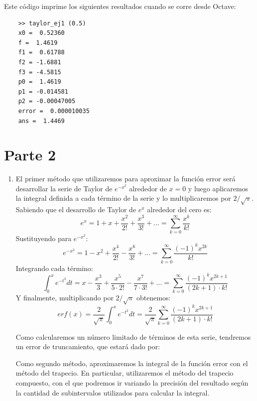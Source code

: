 \documentclass[titlepage,a4paper]{article}
\begin{document}
Este código imprime los siguientes resultados cuando se corre desde Octave:

\begin{lstlisting}
	>> taylor_ej1 (0.5)
	x0 =  0.52360
	f =  1.4619
	f1 =  0.61788
	f2 = -1.6881
	f3 = -4.5815
	p0 =  1.4619
	p1 = -0.014581
	p2 = -0.00047005
	error =  0.000010035
	ans =  1.4469
\end{lstlisting}

\section{Parte 2}\label{sec:parte2}
	\begin{enumerate}[label=(\alph*)]
		\item 
			El primer método que utilizaremos para aproximar la función error\cite{error_function} será desarrollar la serie de Taylor 
			de $e^{-x^2}$ alrededor de $x=0$ y luego aplicaremos la integral definida a cada término de la serie y 
			lo multiplicaremos por $2/\sqrt{\pi}$.\\
			Sabiendo que el desarrollo de Taylor de $e^x$ alrededor del cero es:
				\begin{equation}
					e^x = 1 + x + \frac{x^2}{2!} + \frac{x^3}{3!} + ... = \sum_{k=0}^{\infty}\frac{x^k}{k!}\label{eq:3}
				\end{equation}
			Sustituyendo para $e^{-x^2}$:
				\begin{equation}
					e^{-x^2} = 1 - x^2 + \frac{x^4}{2!} - \frac{x^6}{3!} + ... = \sum_{k=0}^{\infty}\frac{(-1)^k x^{2k}}{k!}
				\end{equation}
			Integrando cada término:
				\begin{equation}
					\int_{0}^{x}e^{-t^2}dt= x - \frac{x^3}{3} + \frac{x^5}{5\cdot2!} - \frac{x^7}{7\cdot3!} + ... = \sum_{k=0}^{\infty}\frac{(-1)^k x^{2k+1}}{(2k+1)\cdot k!}
				\end{equation}
			Y finalmente, multiplicando por $2/\sqrt{\pi}$ obtenemos:
				\begin{equation}
					erf(x) = \frac{2}{\sqrt{\pi}}\int_{0}^{x}e^{-t^2}dt = \frac{2}{\sqrt{\pi}}\sum_{k=0}^{\infty}\frac{(-1)^k x^{2k+1}}{(2k+1)\cdot k!}
				\end{equation}

			Como calcularemos un número limitado de términos de esta serie, tendremos un error de truncamiento, que estará dado por:


			Como segundo método, aproximaremos la integral de la función error con el método del trapecio\cite{burden1}. 
			En particular, utilizaremos el método del trapecio compuesto\cite{burden2}, con el que podremos ir variando 
			la precisión del resultado según la cantidad de subintervalos utilizados para calcular la integral.


\end{enumerate}
\end{document}
